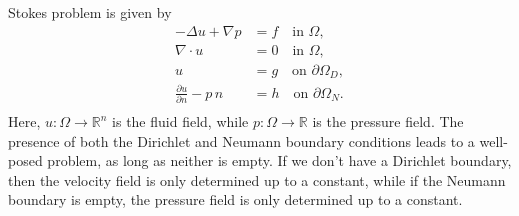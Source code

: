 Stokes problem is given by
\begin{equation}
    \begin{split}
        -\Delta u + \nabla p &= f \quad \text{in } \Omega, \\
        \nabla \cdot u &= 0 \quad \text{in } \Omega, \\
        u &= g \quad \text{on } \partial\Omega_D, \\
        \frac{\partial u}{\partial n} - p\, n &= h \quad \text{on } \partial\Omega_N. \\
    \end{split}
\end{equation}
Here, \( u \colon \Omega \to \mathbb{R}^n \) is the fluid field, while \( p \colon \Omega \to \mathbb{R} \) is the pressure field.
The presence of both the Dirichlet and Neumann boundary conditions leads to a well-posed problem, as long as neither is empty.
If we don't have a Dirichlet boundary, then the velocity field is only determined up to a constant, while if the Neumann boundary is empty, the pressure field is only determined up to a constant.

